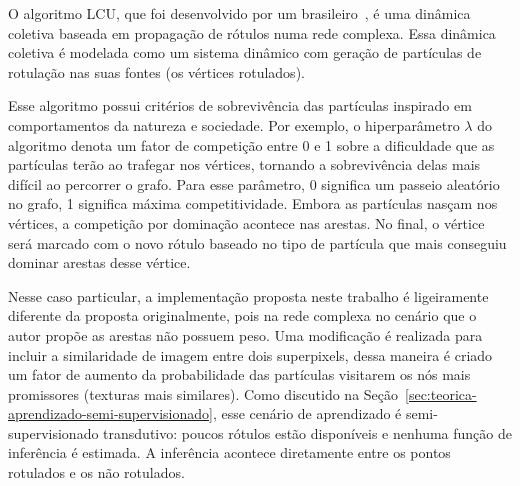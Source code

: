 O algoritmo \gls{LCU}, que foi desenvolvido por um
brasileiro~\cite{VerriNetworkUnfoldingMap2018}, é uma dinâmica
coletiva baseada em propagação de rótulos numa rede complexa. Essa
dinâmica coletiva é modelada como um sistema dinâmico com geração de
partículas de rotulação nas suas fontes (os vértices rotulados).

Esse algoritmo possui critérios de sobrevivência das partículas
inspirado em comportamentos da natureza e sociedade. Por exemplo, o
hiperparâmetro $ \lambda $ do algoritmo denota um fator de competição entre
0 e 1 sobre a dificuldade que as partículas terão ao trafegar nos
vértices, tornando a sobrevivência delas mais difícil ao percorrer o
grafo. Para esse parâmetro, 0 significa um passeio aleatório no grafo,
1 significa máxima competitividade. Embora as partículas nasçam nos
vértices, a competição por dominação acontece nas arestas. No final, o
vértice será marcado com o novo rótulo baseado no tipo de partícula
que mais conseguiu dominar arestas desse vértice.

Nesse caso particular, a implementação proposta neste trabalho é
ligeiramente diferente da proposta originalmente, pois na rede complexa
no cenário que o autor propõe as arestas não possuem peso. Uma
modificação é realizada para incluir a similaridade de imagem entre
dois superpixels, dessa maneira é criado um fator de aumento da
probabilidade das partículas visitarem os nós mais promissores
(texturas mais similares). Como discutido na
Seção~\ref{sec:teorica-aprendizado-semi-supervisionado}, esse cenário
de aprendizado é semi-supervisionado transdutivo: poucos rótulos estão
disponíveis e nenhuma função de inferência é estimada. A inferência
acontece diretamente entre os pontos rotulados e os não rotulados.


